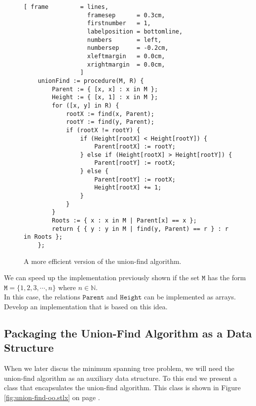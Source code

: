\begin{figure}[!ht]
\centering
\begin{Verbatim}[ frame         = lines, 
                  framesep      = 0.3cm, 
                  firstnumber   = 1,
                  labelposition = bottomline,
                  numbers       = left,
                  numbersep     = -0.2cm,
                  xleftmargin   = 0.0cm,
                  xrightmargin  = 0.0cm,
                ]
    unionFind := procedure(M, R) {
        Parent := { [x, x] : x in M };
        Height := { [x, 1] : x in M };
        for ([x, y] in R) {
            rootX := find(x, Parent);
            rootY := find(y, Parent);
            if (rootX != rootY) {
                if (Height[rootX] < Height[rootY]) {
                    Parent[rootX] := rootY;  
                } else if (Height[rootX] > Height[rootY]) {
                    Parent[rootY] := rootX;  
                } else {
                    Parent[rootY] := rootX;  
                    Height[rootX] += 1;
                }
            }
        }
        Roots := { x : x in M | Parent[x] == x };
        return { { y : y in M | find(y, Parent) == r } : r in Roots };
    };
\end{Verbatim}
\vspace*{-0.3cm}
\caption{A more efficient version of the union-find algorithm.}
\label{fig:union-find.stlx}
\end{figure}

\exercise
We can speed up the implementation previously shown if the set $\texttt{M}$ has the form
\\[0.2cm]
\hspace*{1.3cm}
$\texttt{M} = \{ 1, 2, 3, \cdots, n \}$ \quad where $n \in \mathbb{N}$.
\\[0.2cm]
In this case, the relations $\texttt{Parent}$ and $\texttt{Height}$ can be implemented as arrays.
Develop an implementation that is based on this idea.
\eox

\subsection{Packaging the  Union-Find Algorithm as a Data Structure}
When we later discus  the minimum spanning tree problem,  we will need the union-find algorithm as an
auxiliary data structure.  To this end we present a class that encapsulates the union-find
algorithm.  This class is shown in Figure \ref{fig:union-find-oo.stlx} on page
\pageref{fig:union-find-oo.stlx}.

